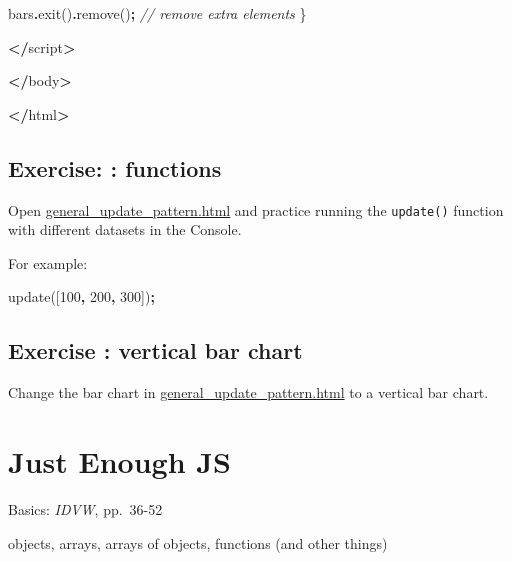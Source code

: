 \documentclass[
  openany]{book}
\newenvironment{Shaded}{\begin{snugshade}}{\end{snugshade}}
\newcommand{\CommentTok}[1]{\textcolor[rgb]{0.56,0.35,0.01}{\textit{#1}}}
\newcommand{\DecValTok}[1]{\textcolor[rgb]{0.00,0.00,0.81}{#1}}
\newcommand{\FunctionTok}[1]{\textcolor[rgb]{0.00,0.00,0.00}{#1}}
\newcommand{\NormalTok}[1]{#1}
\newcommand{\OperatorTok}[1]{\textcolor[rgb]{0.81,0.36,0.00}{\textbf{#1}}}
\begin{document}
\begin{Shaded}
\begin{Highlighting}[]
\NormalTok{    bars}\OperatorTok{.}\FunctionTok{exit}\NormalTok{()}\OperatorTok{.}\FunctionTok{remove}\NormalTok{()}\OperatorTok{;}    \CommentTok{// remove extra elements}
\NormalTok{    \}}

    \OperatorTok{\textless{}/}\NormalTok{script}\OperatorTok{\textgreater{}}

  \OperatorTok{\textless{}/}\NormalTok{body}\OperatorTok{\textgreater{}}

\OperatorTok{\textless{}/}\NormalTok{html}\OperatorTok{\textgreater{}}
\end{Highlighting}
\end{Shaded}

\hypertarget{exercise-functions}{%
\section{Exercise: : functions}\label{exercise-functions}}

Open \href{code/general_update_pattern.html}{general\_update\_pattern.html} and practice running the \texttt{update()} function with different datasets in the Console.

For example:

\begin{Shaded}
\begin{Highlighting}[]
\NormalTok{update([}\DecValTok{100}\OperatorTok{,} \DecValTok{200}\OperatorTok{,} \DecValTok{300}\NormalTok{])}\OperatorTok{;}
\end{Highlighting}
\end{Shaded}

\hypertarget{exercise-vertical-bar-chart}{%
\section{Exercise : vertical bar chart}\label{exercise-vertical-bar-chart}}

Change the bar chart in \href{code/general_update_pattern.html}{general\_update\_pattern.html} to a vertical bar chart.

\hypertarget{just-enough-js}{%
\chapter{\texorpdfstring{Just Enough JS }{Just Enough JS }}\label{just-enough-js}}

Basics: \emph{IDVW}, pp.~36-52

objects, arrays, arrays of objects, functions (and other things)
\end{document}
